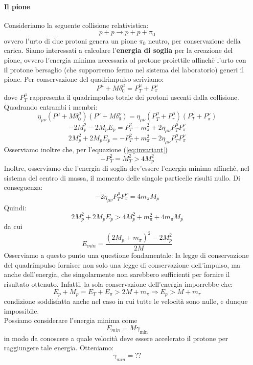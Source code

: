 \documentclass[a4paper,11pt]{book}
\theoremstyle{plain}
\theoremstyle{definition}
\begin{document}
\paragraph{Il pione}
Consideriamo la seguente collisione relativistica:
\[
p+p\to p+p+\pi_0
\]
ovvero l'urto di due protoni genera un pione $\pi_0$ neutro, per conservazione della carica. Siamo interessati a calcolare l'\textbf{energia di soglia} per la creazione del pione, ovvero l'energia minima necessaria al protone proiettile affinchè l'urto con il protone bersaglio (che supporremo fermo nel sistema del laboratorio) generi il pione. Per conservazione del quadrimpulso scriviamo:
\[
P^{\mu}+M\delta_0^{\mu}=P_T^{\mu}+P^{\mu}_{\pi}
\]
dove $P_T^{\mu}$ rappresenta il quadrimpulso totale dei protoni uscenti dalla collisione. Quadrando entrambi i membri:
\[
\eta_{\mu\nu}(P^{\mu}+M\delta_0^{\mu})(P^{\nu}+M\delta_0^{\nu})=\eta_{\mu\nu}(P_T^{\mu}+P^{\mu}_{\pi})(P_T^{\nu}+P^{\nu}_{\pi})
\]
\[
-2M_p^2-2M_pE_p=P_T^2-m_{\pi}^2+2\eta_{\mu\nu}P^{\mu}_TP^{\nu}_{\pi}
\]
\[
2M_p^2+2M_pE_p=-P_T^2+m_{\pi}^2-2\eta_{\mu\nu}P^{\mu}_TP^{\nu}_{\pi}
\]
Osserviamo inoltre che, per l'equazione (\ref{eq:invariant})
\[
-P^2_T=M_T^2>4M_p^2
\]
Inoltre, osserviamo che l'energia di soglia dev'essere l'energia minima affinchè, nel sistema del centro di massa, il momento delle singole particelle risulti nullo. Di conseguenza:
\[
-2\eta_{\mu\nu}P^{\mu}_TP^{\nu}_{\pi}=4m_{\pi}M_p
\]
Quindi:
\[
2M_p^2+2M_pE_p>4M_p^2+m_{\pi}^2+4m_{\pi}M_p
\]
da cui
\begin{equation}
E_{min}=\frac{(2M_p+m_{\pi})^2-2M_p^2}{2M}
\end{equation}
Osserviamo a questo punto una questione fondamentale: la legge di conservazione del quadrimpulso fornisce non solo una legge di conservazione dell'impulso, ma anche dell'energia, che singolarmente non sarebbero sufficienti per fornire il risultato ottenuto. Infatti, la sola conservazione dell'energia imporrebbe che:
\[
E_p+M_p = E_T+E_{\pi} > 2M+m_{\pi} \Rightarrow E_p > M+m_{\pi}
\]
condizione soddisfatta anche nel caso in cui tutte le velocità sono nulle, e dunque impossibile. \\
Possiamo considerare l'energia minima come
\[
E_{min}=M\gamma_{\min}
\]
in modo da conoscere a quale velocità deve essere accelerato il protone per raggiungere tale energia. Otteniamo:
\[
\gamma_{min} = ??
\]
\end{document}

